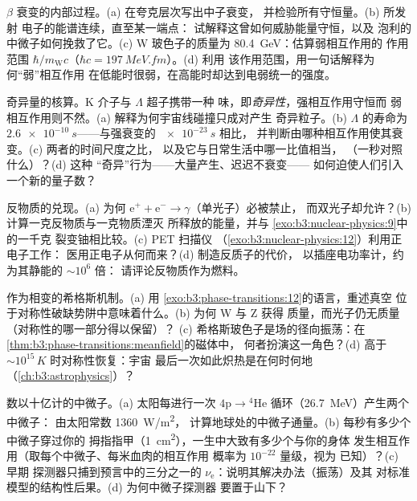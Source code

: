\begin{exercise}[$\star\star$]\label{exo:b3:particle-physics:6}
$\beta$ 衰变的内部过程。(a) 在夸克层次写出中子衰变，
并检验所有守恒量。(b) 所发射
电子的能谱连续，直至某一端点：
试解释这曾如何威胁能量守恒，以及
泡利的中微子如何挽救了它。(c) W 玻色子的质量为
\qty{80.4}{GeV}：估算弱相互作用的
作用范围 $\hbar/m_{\text{W}}c$（$\hbar c = \qty{197}{MeV.fm}$）。(d) 利用
该作用范围，用一句话解释为何“弱”相互作用
在低能时很弱，在高能时却达到电弱统一的强度。
\end{exercise}

\begin{exercise}[$\star\star$]\label{exo:b3:particle-physics:7}
奇异量的核算。K 介子与 $\Lambda$ 超子携带一种
味，即\emph{奇异性}，强相互作用守恒而
弱相互作用则不然。(a) 解释为何宇宙线碰撞只成对产生
奇异粒子。(b) $\Lambda$ 的寿命为
$\qty{2.6e-10}{s}$——与强衰变的 $\qty{e-23}{s}$ 相比，
并判断由哪种相互作用使其衰变。(c) 两者的时间尺度之比，
以及它与日常生活中哪一比值相当，
（一秒对照什么）？(d) 这种
“奇异”行为——大量产生、迟迟不衰变——
如何迫使人们引入一个新的量子数？
\end{exercise}

\begin{exercise}[$\star\star$]\label{exo:b3:particle-physics:8}
反物质的兑现。(a) 为何
$\text{e}^+ + \text{e}^- \to \gamma$（单光子）必被禁止，
而双光子却允许？(b) 计算一克反物质与一克物质湮灭
所释放的能量，并与
\cref{exo:b3:nuclear-physics:9}中的一千克
裂变铀相比较。(c) PET 扫描仪
（\cref{exo:b3:nuclear-physics:12}）利用正电子工作：
医用正电子从何而来？(d) 制造反质子的代价，
以插座电功率计，约为其静能的 $\sim10^{6}$ 倍：
请评论反物质作为燃料。
\end{exercise}

\begin{exercise}[$\star\star\star$]\label{exo:b3:particle-physics:9}
作为相变的希格斯机制。(a) 用
\cref{exo:b3:phase-transitions:12}的语言，重述真空
位于对称性破缺势阱中意味着什么。(b) 为何 W 与 Z 获得
质量，而光子仍无质量（对称性的哪一部分得以保留）？
(c) 希格斯玻色子是场的径向振荡：在
\cref{thm:b3:phase-transitions:meanfield}的磁体中，
何者扮演这一角色？(d) 高于
$\sim10^{15}\,\unit{K}$ 时对称性恢复：宇宙
最后一次如此炽热是在何时何地（\cref{ch:b3:astrophysics}）？
\end{exercise}

\begin{exercise}[$\star\star\star$]\label{exo:b3:particle-physics:10}
数以十亿计的中微子。(a) 太阳每进行一次
$4\text{p} \to {}^4\text{He}$ 循环（\qty{26.7}{MeV}）产生两个中微子：
由太阳常数 \qty{1360}{W/m^2}，
计算地球处的中微子通量。(b) 每秒有多少个中微子穿过你的
拇指指甲（\qty{1}{cm^2}），一生中大致有多少个与你的身体
发生相互作用（取每个中微子、每米血肉的相互作用
概率为 $10^{-22}$ 量级，视为
已知）？(c) 早期
探测器只捕到预言中的三分之一的
$\nu_{\text{e}}$：说明其解决办法（振荡）及其
对标准模型的结构性后果。(d) 为何中微子探测器
要置于山下？
\end{exercise}

